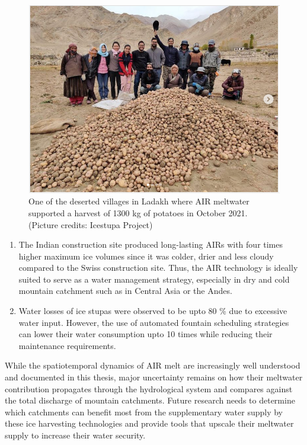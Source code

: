 \begin{figure}[htb]
  \centering
	\includegraphics[width=8 cm]{figs/Kullum_potatoes}
	\caption{One of the deserted villages in Ladakh where AIR meltwater supported a harvest of 1300 kg of
		potatoes in October 2021. (Picture credits: Icestupa Project)}
	\label{fig:kullum_potatoes}
\end{figure}

\begin{enumerate}

  \item The Indian construction site produced long-lasting AIRs with four times higher maximum ice volumes since
    it was colder, drier and less cloudy compared to the Swiss construction site. Thus, the AIR technology is
    ideally suited to serve as a water management strategy, especially in dry and cold mountain catchment such
    as in Central Asia or the Andes.

  \item Water losses of ice stupas were observed to be upto 80 \% due to excessive water input. However, the use
    of automated fountain scheduling strategies can lower their water consumption upto 10 times while reducing
    their maintenance requirements.

\end{enumerate}

While the spatiotemporal dynamics of AIR melt are increasingly well understood and documented in this thesis,
major uncertainty remains on how their meltwater contribution propagates through the hydrological system and
compares against the total discharge of mountain catchments. Future research needs to determine which catchments
can benefit most from the supplementary water supply by these ice harvesting technologies and provide tools that
upscale their meltwater supply to increase their water security.


